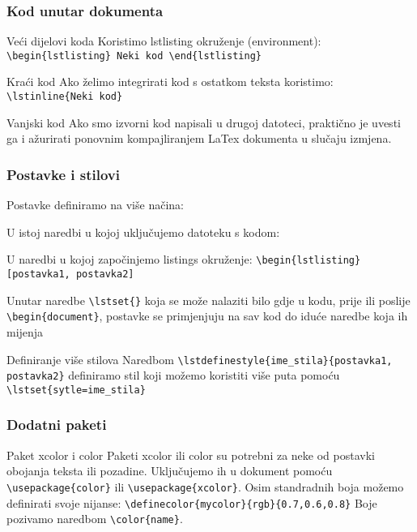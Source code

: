 \documentclass{beamer}
\begin{document}
	\begin{frame}[fragile]
		\frametitle{Kod unutar dokumenta}
		\begin{block}{Veći dijelovi koda}
			Koristimo lstlisting okruženje (environment): \verb|\begin{lstlisting} Neki kod \end{lstlisting}|
		\end{block}
		\begin{block}{Kraći kod}
			Ako želimo integrirati kod s ostatkom teksta koristimo: \verb|\lstinline{Neki kod}|
		\end{block}
		\begin{block}{Vanjski kod}
		Ako smo izvorni kod napisali u drugoj datoteci, praktično je uvesti ga i ažurirati ponovnim kompajliranjem LaTex dokumenta u slučaju izmjena.
		\verb||
		\end{block}
	\end{frame}
	\begin{frame}[fragile]
		\frametitle{Postavke i stilovi}
		Postavke definiramo na više načina:
		\begin{itemize}
			\begin{item}
			U istoj naredbi u kojoj uključujemo datoteku s kodom: \verb||
			\end{item}
			\begin{item}			
			U naredbi u kojoj započinjemo listings okruženje: \verb|\begin{lstlisting}[postavka1, postavka2]|
			\end{item}
			\begin{item}
Unutar naredbe \verb|\lstset{}| koja se može nalaziti bilo gdje u kodu, prije ili poslije \verb|\begin{document}|, postavke se primjenjuju na sav kod do iduće naredbe koja ih mijenja
			\end{item}
		\end{itemize}
		\begin{block}{Definiranje više stilova}
				Naredbom \verb|\lstdefinestyle{ime_stila}{postavka1, postavka2}| definiramo stil koji možemo koristiti više puta pomoću \verb|\lstset{sytle=ime_stila}|
		\end{block}
	\end{frame}
	\begin{frame}[fragile]
		\frametitle{Dodatni paketi}
		\begin{block}{Paket xcolor i color}
		Paketi xcolor ili color su potrebni za neke od postavki obojanja teksta ili pozadine. Uključujemo ih u dokument pomoću
\verb|\usepackage{color}| ili \verb|\usepackage{xcolor}|.
Osim standradnih boja možemo definirati svoje nijanse: \verb|\definecolor{mycolor}{rgb}{0.7,0.6,0.8}|
Boje pozivamo naredbom \verb|\color{name}|.
	\end{block}
	\end{frame}
	
\end{document}
